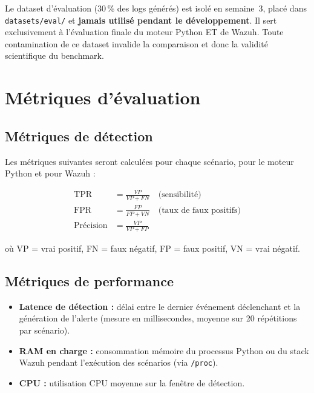 \documentclass[11pt,a4paper]{article}
\begin{document}
\begin{infobox}[title={Règle d'or — Dataset d'évaluation}]
Le dataset d'évaluation (30\,\% des logs générés) est isolé en semaine~3,
placé dans \texttt{datasets/eval/} et \textbf{jamais utilisé pendant le développement}.
Il sert exclusivement à l'évaluation finale du moteur Python ET de Wazuh.
Toute contamination de ce dataset invalide la comparaison et donc
la validité scientifique du benchmark.
\end{infobox}

\section{Métriques d'évaluation}

\subsection{Métriques de détection}

Les métriques suivantes seront calculées pour chaque scénario,
pour le moteur Python et pour Wazuh :

\begin{align}
  \text{TPR} &= \frac{VP}{VP + FN} \quad \text{(sensibilité)} \\
  \text{FPR} &= \frac{FP}{FP + VN} \quad \text{(taux de faux positifs)} \\
  \text{Précision} &= \frac{VP}{VP + FP}
\end{align}

où VP = vrai positif, FN = faux négatif, FP = faux positif, VN = vrai négatif.

\subsection{Métriques de performance}

\begin{itemize}
  \item \textbf{Latence de détection :} délai entre le dernier événement
        déclenchant et la génération de l'alerte (mesure en millisecondes,
        moyenne sur 20 répétitions par scénario).
  \item \textbf{RAM en charge :} consommation mémoire du processus Python
        ou du stack Wazuh pendant l'exécution des scénarios (via \texttt{/proc}).
  \item \textbf{CPU :} utilisation CPU moyenne sur la fenêtre de détection.
\end{itemize}
\end{document}

